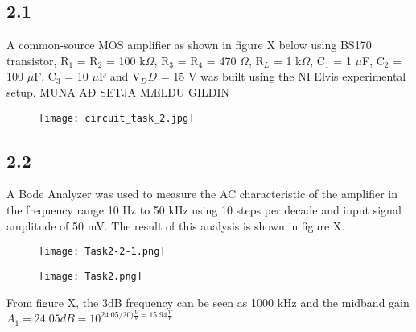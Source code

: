 \subsection*{2.1}
A common-source MOS amplifier as shown in figure X below using BS170 transistor, R$_1$ = R$_2$ = 100 k$\Omega$, R$_3$ = R$_4$ = 470 $\Omega$, R$_L$ = 1 k$\Omega$, C$_1$ = 1 $\mu$F, C$_2$ = 100 $\mu$F, C$_3$ = 10 $\mu$F and V$_DD$ = 15 V was built using the NI Elvis experimental setup. MUNA AÐ SETJA MÆLDU GILDIN

    \begin{figure}[h!]
        \centering
        \texttt{[image: circuit\_task\_2.jpg]}
    \end{figure}



\subsection*{2.2}


A Bode Analyzer was used to measure the AC characteristic of the amplifier in the frequency range 10 Hz to 50 kHz using 10 steps per decade and input signal amplitude of 50 mV. The result of this analysis is shown in figure X.

    \begin{figure}[h!]
        \centering
        \texttt{[image: Task2-2-1.png]}
    \end{figure}

    \begin{figure}[h!]
        \centering
        \texttt{[image: Task2.png]}
    \end{figure}

From figure X, the 3dB frequency can be seen as 1000 kHz and the midband gain $A_1 = 24.05 dB = 10^{24.05/20) \frac{V}{V} = 15.94 \frac{V}{V}}$

